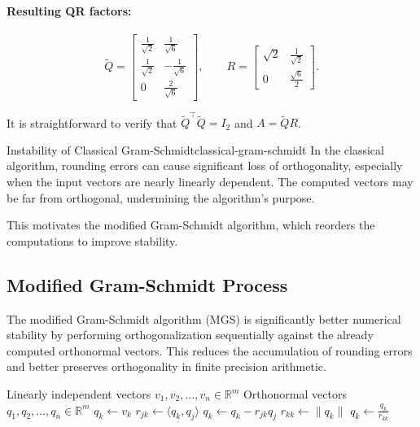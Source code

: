 \paragraph{Resulting QR factors:}
\[
    \widetilde{Q} = \begin{bmatrix}
        \frac{1}{\sqrt{2}} & \frac{1}{\sqrt{6}}  \\
        \frac{1}{\sqrt{2}} & -\frac{1}{\sqrt{6}} \\
        0                  & \frac{2}{\sqrt{6}}
    \end{bmatrix}, \qquad
    R = \begin{bmatrix}
        \sqrt{2} & \frac{1}{\sqrt{2}} \\
        0        & \frac{\sqrt{6}}{2}
    \end{bmatrix}.
\]

It is straightforward to verify that $\widetilde{Q}^\top \widetilde{Q} = I_2$ and $A = \widetilde{Q} R$.

\begin{remark}{Instability of Classical Gram-Schmidt}{classical-gram-schmidt}
    In the classical algorithm, rounding errors can cause significant loss of orthogonality, especially when the input vectors are nearly linearly dependent.
    The computed vectors may be far from orthogonal, undermining the algorithm's purpose.
\end{remark}

This motivates the modified Gram-Schmidt algorithm, which reorders the computations to improve stability.

\subsection{Modified Gram-Schmidt Process}
The modified Gram-Schmidt algorithm (MGS) is significantly better numerical stability by performing orthogonalization sequentially against the already computed orthonormal vectors.
This reduces the accumulation of rounding errors and better preserves orthogonality in finite precision arithmetic.
\begin{algorithm}[H]
    \caption{Modified Gram-Schmidt}
    \begin{algorithmic}
        \Require Linearly independent vectors $v_1, v_2, \ldots, v_n \in \mathbb{R}^m$
        \Ensure Orthonormal vectors $q_1, q_2, \ldots, q_n \in \mathbb{R}^m$
        \State $q_k \leftarrow v_k$
        \State $r_{jk} \leftarrow \langle q_k, q_j \rangle$ 
        \State $q_k \leftarrow q_k - r_{jk} q_j$ 
        \EndFor
        \State $r_{kk} \leftarrow \|q_k\|$
        \State $q_k \leftarrow \frac{q_k}{r_{kk}}$ 
        \EndFor
    \end{algorithmic}
\end{algorithm}

